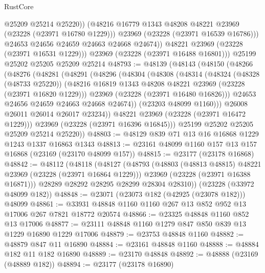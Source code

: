 \begin{lexlean}{RustCore}
\begin{coremodule}
                  @25209
                  @25214
                  @25220))
              (@48216 @16779 @1343 @48208 @48221 @23969 (@23228 (@23971 @16780 @1229)))
              @23969
              (@23228 (@23971 @16539 @16786)))
            @24653
            @24656
            @24659
            @24663
            @24668
            @24674))
        @48221
        @23969
        (@23228 (@23971 @16531 @1229)))
      @23969
      (@23228 (@23971 @16488 @16801)))
    @25199
    @25202
    @25205
    @25209
    @25214
@48793 := @48139
    (@48143
      (@48150
        (@48266
          (@48276
            (@48281
              (@48291
                (@48296
                  (@48304
                    (@48308
                      (@48314
                        (@48324
                          (@48328 (@48733 @25220))
                          (@48216 @16819 @1343 @48208 @48221 @23969 (@23228 (@23971 @16820 @1229)))
                          @23969
                          (@23228 (@23971 @16480 @16826)))
                        @24653
                        @24656
                        @24659
                        @24663
                        @24668
                        @24674))
                    (@23203 @48099 @1160)))
                @26008
                @26011
                @26014
                @26017
                @23234))
            @48221
            @23969
            (@23228 (@23971 @16472 @1229)))
          @23969
          (@23228 (@23971 @16396 @16845)))
        @25199
        @25202
        @25205
        @25209
        @25214
        @25220))
@48803 := @48129 @839 @71 @13 @16 @16868 @1229 @1243 @1337 @16863 @1343
@48813 := @23161 @48099 @1160 @157 @13 @157 @16868 (@23169 (@23170 @48099 @157))
@48815 := @23177 (@23178 @16868)
@48842 := @48112
    (@48118
      (@48127
        (@48793
          (@48803 (@48813 @48815) @48221 @23969 (@23228 (@23971 @16864 @1229)))
          @23969
          (@23228 (@23971 @16388 @16871)))
        @28289
        @28292
        @28295
        @28299
        @28304
        @28310))
    (@23228 (@33972 @48099 @182))
@48848 := @23071 (@23073 @182 (@42925 (@23078 @182))) @48099
@48861 := @33931 @48848 @1160 @1160 @267 @13 @852 @952 @13 @17006 @267 @7821 @18772 @20574
@48866 := @23325 @48848 @1160 @852 @13 @17006
@48877 := @23111 @48848 @1160 @1279 @847 @850 @839 @13 @1229 @16890 @1229 @17006
@48879 := @23753 @48848 @1160
@48882 := @48879 @847 @11 @16890
@48884 := @23161 @48848 @1160
@48888 := @48884 @182 @11 @182 @16890
@48889 := @23170 @48848
@48892 := @48888 (@23169 (@48889 @182))
@48894 := @23177 (@23178 @16890)

\end{coremodule}
\end{lexlean}
